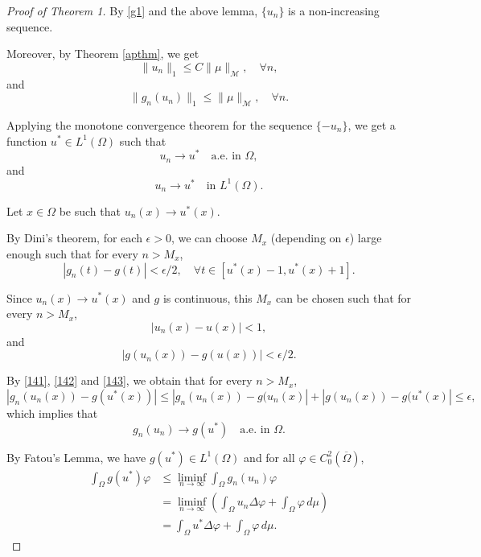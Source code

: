 \documentclass[a4paper, 11pt]{report}
\theoremstyle{definition}\newtheorem*{rmk}{Remark}
\begin{document}
\begin{proof}[Proof of Theorem 1]
\mbox{}

By \eqref{g1} and the above lemma, $\{u_n\}$ is a non-increasing sequence.

Moreover, by Theorem \ref{apthm}, we get
\begin{equation}\label{413}
\| u_n \|_1 \le C \| \mu \|_{\mathcal{M}}, \quad \forall n,
\end{equation}
and
\begin{equation}\label{414}
\| g_n(u_n) \|_1 \le \| \mu \|_{\mathcal{M}}, \quad \forall n.
\end{equation}

Applying the monotone convergence theorem for the sequence $\{-u_n\}$, we get a function $u^* \in L^1(\Omega)$ such that
\[
u_n \to u^* \quad \text{a.e.\ in } \Omega,
\]
and
\begin{equation}\label{415}
u_n \to u^* \quad \text{in } L^1(\Omega).
\end{equation}

Let $x\in \Omega$ be such that $u_n(x)\to u^*(x)$.

By Dini's theorem, for each $\epsilon > 0$, we can choose $M_x$ (depending on $\epsilon$) large enough such that for every $n > M_x$,
\begin{equation}\label{141}
|g_n(t) - g(t)| < \epsilon / 2, \quad \forall t \in [u^*(x) - 1, u^*(x) + 1].
\end{equation}

Since $u_n(x)\to u^*(x)$ and $g$ is continuous, this $M_x$ can be chosen such that for every $n > M_x$,
\begin{equation}\label{142}
|u_n(x) - u(x)|  < 1,
\end{equation}
and
\begin{equation}\label{143}
|g(u_n(x)) - g(u(x))| < \epsilon / 2 .
\end{equation}

By \eqref{141}, \eqref{142} and \eqref{143}, we obtain that for every $n > M_x$,
\[
|g_n(u_n(x)) - g(u^*(x))| \le |g_n(u_n(x)) - g(u_n(x)| +|g(u_n(x)) - g(u^*(x)| \le \epsilon,
\]
which implies that
\begin{equation}\label{417}
g_n(u_n) \to g(u^*)\quad\text{a.e.\ in }\Omega.
\end{equation}

By Fatou's Lemma, we have $g(u^*) \in L^1(\Omega)$ and for all $\varphi \in C^2_0(\overline{\Omega})$,
\begin{align*}
\int_{\Omega} g(u^*)\varphi &\le \liminf_{n\to \infty} \int_{\Omega} g_n(u_n)\varphi \\
&= \liminf_{n\to \infty}\left( \int_{\Omega}u_n\Delta \varphi + \int_{\Omega}\varphi \,d\mu \right)\\
&= \int_{\Omega}u^* \Delta\varphi + \int_{\Omega}\varphi \,d\mu.
\end{align*}


\end{proof}
\end{document}
